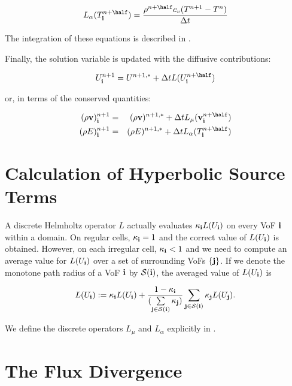 \begin{equation}
L_\alpha(T^{n+\half}_\ib) = \frac{\rho^{n+\half} c_v (T^{n+1} - T^n)}{\dt}
\end{equation}

The integration of these equations is described in . 

Finally, the solution variable is updated with the diffusive contributions:

\begin{equation}
U^{n+1}_\ib = U^{n+1,*} + \dt L(U^{n+\half}_\ib) \label{eq:Uupdate}
\end{equation}

\noindent
or, in terms of the conserved quantities:

\begin{eqnarray}
(\rho\vec{v})^{n+1}_\ib &=& (\rho\vec{v})^{n+1,*} + \dt L_\mu(\vec{v}^{n+\half}_\ib) \label{eq:rhovupdate} \\
(\rho E)^{n+1}_\ib &=& (\rho E)^{n+1,*} + \dt L_\alpha(T^{n+\half}_\ib) \label{eq:rhoEupdate}
\end{eqnarray}

\section{Calculation of Hyperbolic Source Terms\label{sec:HyperbolicSources}}

A discrete Helmholtz operator $L$ actually evaluates $\kappa_{\bf i} L(U_{\bf i})$ on 
every VoF ${\bf i}$ within a domain. On regular cells, $\kappa_{\bf i} = 1$ and 
the correct value of $L(U_{\bf i})$ is obtained. However, on each irregular 
cell, $\kappa_{\bf i} < 1$ and we need to compute an average value for $L(U_{\bf i})$ 
over a set of surrounding VoFs $\{{\bf j}\}$. If we denote the monotone path radius 
of a VoF ${\bf i}$ by $\mathcal{S}({\bf i})$, the averaged value of 
$L(U_{\bf i})$ is 

\begin{equation}
L(U_{\bf i}) := \kappa_{\bf i} L(U_{\bf i}) + \frac{1-\kappa_{\bf i}}
{(\sum\limits_{{\bf j} \in \mathcal{S}({\bf i})} \kappa_{\bf j})} 
\sum\limits_{{\bf j} \in \mathcal{S}({\bf i})} \kappa_{\bf j} L(U_{\bf j}).
\end{equation}

We define the discrete operators $L_\mu$ and $L_\alpha$ explicitly in 
.

\section{The Flux Divergence\label{sec:FluxDivergence}}

